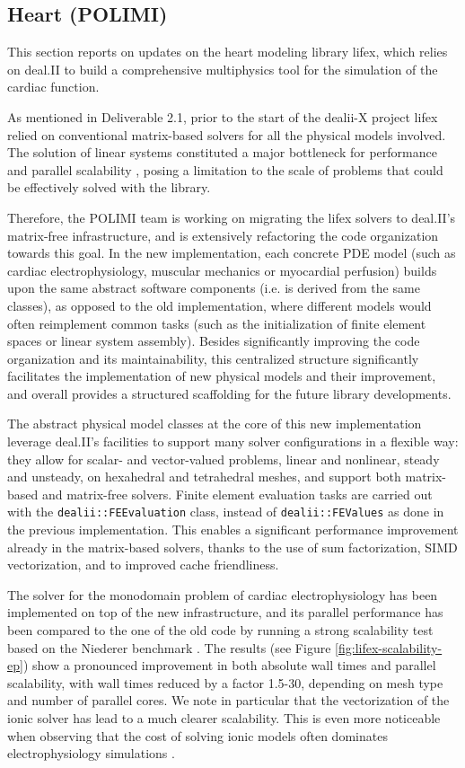 \documentclass[a4paper,12pt]{article}
\begin{document}
\subsection{Heart (POLIMI)}

This section reports on updates on the heart modeling library lifex, which relies on deal.II to build a comprehensive multiphysics tool for the simulation of the cardiac function.

As mentioned in Deliverable 2.1, prior to the start of the dealii-X project lifex relied on conventional matrix-based solvers for all the physical models involved. The solution of linear systems constituted a major bottleneck for performance and parallel scalability \cite{africa2023lifexep,africa2024lifexcfd}, posing a limitation to the scale of problems that could be effectively solved with the library.

Therefore, the POLIMI team is working on migrating the lifex solvers to deal.II's matrix-free infrastructure, and is extensively refactoring the code organization towards this goal. In the new implementation, each concrete PDE model (such as cardiac electrophysiology, muscular mechanics or myocardial perfusion) builds upon the same abstract software components (i.e. is derived from the same classes), as opposed to the old implementation, where different models would often reimplement common tasks (such as the initialization of finite element spaces or linear system assembly). Besides significantly improving the code organization and its maintainability, this centralized structure significantly facilitates the implementation of new physical models and their improvement, and overall provides a structured scaffolding for the future library developments.

The abstract physical model classes at the core of this new implementation leverage deal.II's facilities to support many solver configurations in a flexible way: they allow for scalar- and vector-valued problems, linear and nonlinear, steady and unsteady, on hexahedral and tetrahedral meshes, and support both matrix-based and matrix-free solvers. Finite element evaluation tasks are carried out with the \texttt{dealii::FEEvaluation} class, instead of \texttt{dealii::FEValues} as done in the previous implementation. This enables a significant performance improvement already in the matrix-based solvers, thanks to the use of sum factorization, SIMD vectorization, and to improved cache friendliness.

The solver for the monodomain problem of cardiac electrophysiology has been implemented on top of the new infrastructure, and its parallel performance has been compared to the one of the old code by running a strong scalability test based on the Niederer benchmark \cite{niederer2011verification}. The results (see Figure \ref{fig:lifex-scalability-ep}) show a pronounced improvement in both absolute wall times and parallel scalability, with wall times reduced by a factor 1.5-30, depending on mesh type and number of parallel cores. We note in particular that the vectorization of the ionic solver has lead to a much clearer scalability. This is even more noticeable when observing that the cost of solving ionic models often dominates electrophysiology simulations \cite{africa2023lifexep}.
\end{document}
